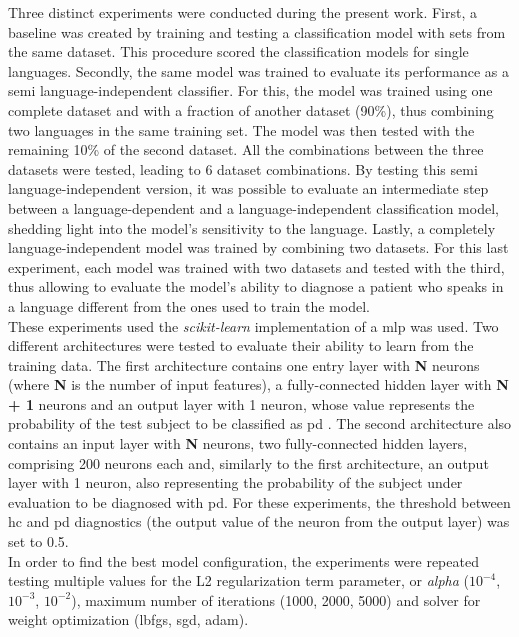 Three distinct experiments were conducted during the present work. First, a baseline was created by training and testing a classification model with sets from the same dataset. This procedure scored the classification models for single languages. Secondly, the same model was trained to evaluate its performance as a semi language-independent classifier. For this, the model was trained using one complete dataset and with a fraction of another dataset (90\%), thus combining two languages in the same training set. The model was then tested with the remaining 10\% of the second dataset. All the combinations between the three datasets were tested, leading to 6 dataset combinations. By testing this semi language-independent version, it was possible to evaluate an intermediate step between a language-dependent and a language-independent classification model, shedding light into the model's sensitivity to the language. Lastly, a completely language-independent model was trained by combining two datasets. For this last experiment, each model was trained with two datasets and tested with the third, thus allowing to evaluate the model's ability to diagnose a patient who speaks in a language different from the ones used to train the model.
\\
These experiments used the \textit{scikit-learn} implementation \cite{scikit-learn} of a \gls{mlp} was used. Two different architectures were tested to evaluate their ability to learn from the training data. The first architecture contains one entry layer with \textbf{N} neurons (where \textbf{N} is the number of input features), a fully-connected hidden layer with \textbf{N + 1} neurons and an output layer with 1 neuron, whose value represents the probability of the test subject to be classified as \gls{pd} \cite{alzheimer_2014_1}. The second architecture also contains an input layer with \textbf{N} neurons, two fully-connected hidden layers, comprising 200 neurons each and, similarly to the first architecture, an output layer with 1 neuron, also representing the probability of the subject under evaluation to be diagnosed with \gls{pd}. For these experiments, the threshold between \gls{hc} and \gls{pd} diagnostics (the output value of the neuron from the output layer) was set to 0.5.
\\
In order to find the best model configuration, the experiments were repeated testing multiple values for the L2 regularization term parameter, or \textit{alpha} ($ 10^{-4} $, $ 10^{-3} $, $ 10 ^{-2} $), maximum number of iterations (1000, 2000, 5000) and solver for weight optimization (lbfgs, sgd, adam). 

